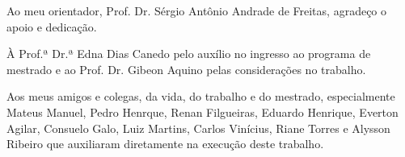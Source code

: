 Ao meu orientador, Prof. Dr. Sérgio Antônio Andrade de Freitas, agradeço o apoio e dedicação.

À Prof.ª Dr.ª Edna Dias Canedo pelo auxílio no ingresso ao programa de mestrado e ao Prof. Dr. Gibeon Aquino pelas considerações no trabalho.

Aos meus amigos e colegas, da vida, do trabalho e do mestrado, especialmente Mateus Manuel, Pedro Henrque, Renan Filgueiras, Eduardo Henrique, Everton Agilar, Consuelo Galo, Luiz Martins, Carlos Vinícius, Riane Torres e Alysson Ribeiro que auxiliaram diretamente na execução deste trabalho. 